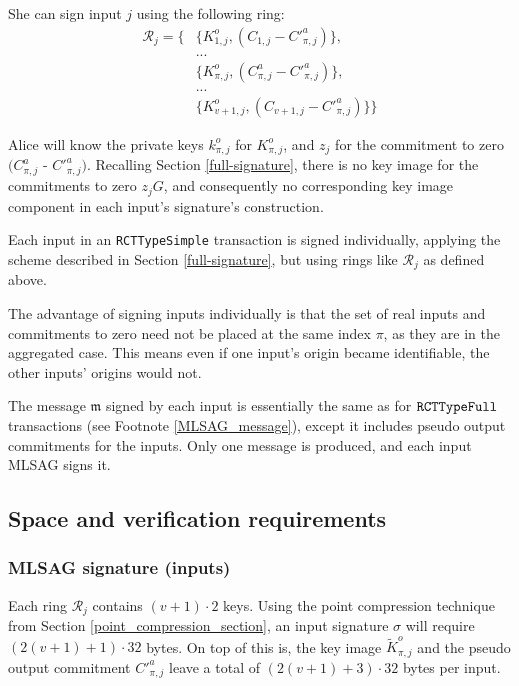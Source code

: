 She can sign input $j$ using the following ring:\vspace{.2cm}
\begin{align*}
\mathcal{R}_j = \{ &\{K^o_{1, j}, (C_{1, j} - C'^a_{\pi, j})\}, \\
&... \\
&\{ K^o_{\pi, j}, (C^a_{\pi, j} - C'^a_{\pi, j})\}, \\
&... \\
&\{ K^o_{v+1, j}, (C_{v+1, j} - C'^a_{\pi, j})\}\}
\end{align*}


Alice will know the private keys $k^o_{\pi,j}$ for $K^o_{\pi,j}$, and $z_j$ for the commitment to zero $(C^a_{\pi,j}$ - $C'^a_{\pi,j})$. Recalling Section \ref{full-signature}, there is no key image for the commitments to zero $z_j G$, and consequently no corresponding key image component in each input’s signature’s construction.

Each input in an {\tt RCTTypeSimple} transaction is signed individually, applying the scheme described in Section \ref{full-signature}, but using rings like \(\mathcal{R}_j\) as defined above.

The advantage of signing inputs individually is that the set of real inputs and commitments to zero need not be placed at the same index $\pi$, as they are in the aggregated case. This means even if one input's origin became identifiable, the other inputs' origins would not.

The message $\mathfrak{m}$ signed by each input is essentially the same as for $\tt RCTTypeFull$ transactions (see Footnote \ref{MLSAG_message}), except it includes pseudo output commitments for the inputs. Only one message is produced, and each input MLSAG signs it.


\subsection{Space and verification requirements}

\subsubsection*{MLSAG signature (inputs)}

Each ring \(\mathcal{R}_j\) contains \((v+1) \cdot 2\) keys. Using the point compression technique from Section \ref{point_compression_section}, an input signature $\sigma$ will require \( (2(v+1) + 1) \cdot 32  \) bytes. On top of this is, the key image $\tilde{K}^o_{\pi,j}$ and the pseudo output commitment $C'^a_{\pi,j}$ leave a total of $(2(v+1)+3) \cdot 32$ bytes per input.

